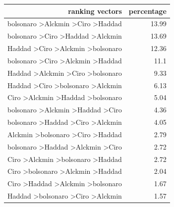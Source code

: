 \documentclass[hidelinks,11pt]{article}
\begin{document}
\begin{table}[H]
  \centering
\begin{tabular}{|r|r|}
\hline
\textbf{ranking vectors}                           & \textbf{percentage} \\ \hline
bolsonaro \textgreater Alckmin \textgreater Ciro \textgreater Haddad & 13.99                                \\ \hline
bolsonaro \textgreater Ciro \textgreater Haddad \textgreater Alckmin & 13.69                                \\ \hline
Haddad \textgreater Ciro \textgreater Alckmin \textgreater bolsonaro & 12.36                                \\ \hline
bolsonaro \textgreater Ciro \textgreater Alckmin \textgreater Haddad & 11.1                                 \\ \hline
Haddad \textgreater Alckmin \textgreater Ciro \textgreater bolsonaro & 9.33                                 \\ \hline
Haddad \textgreater Ciro \textgreater bolsonaro \textgreater Alckmin & 6.13                                 \\ \hline
Ciro \textgreater Alckmin \textgreater Haddad \textgreater bolsonaro & 5.04                                 \\ \hline
bolsonaro \textgreater Alckmin \textgreater Haddad \textgreater Ciro & 4.36                                 \\ \hline
bolsonaro \textgreater Haddad \textgreater Ciro \textgreater Alckmin & 4.05                                 \\ \hline
Alckmin \textgreater bolsonaro \textgreater Ciro \textgreater Haddad & 2.79                                 \\ \hline
bolsonaro \textgreater Haddad \textgreater Alckmin \textgreater Ciro & 2.72                                 \\ \hline
Ciro \textgreater Alckmin \textgreater bolsonaro \textgreater Haddad & 2.72                                 \\ \hline
Ciro \textgreater bolsonaro \textgreater Alckmin \textgreater Haddad & 2.04                                 \\ \hline
Ciro \textgreater Haddad \textgreater Alckmin \textgreater bolsonaro & 1.67                                 \\ \hline
Haddad \textgreater bolsonaro \textgreater Ciro \textgreater Alckmin & 1.57                                 \\ \hline

\end{tabular}
\end{table}
\end{document}
